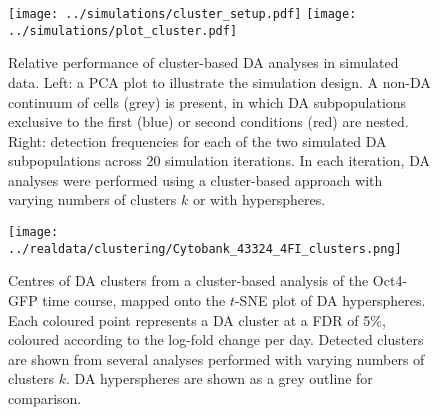 \documentclass{article}
\begin{document}
\begin{figure}[p]
\begin{center}
\texttt{[image: ../simulations/cluster\_setup.pdf]}
\texttt{[image: ../simulations/plot\_cluster.pdf]}
\end{center}
\caption{Relative performance of cluster-based DA analyses in simulated data.
    Left: a PCA plot to illustrate the simulation design.
    A non-DA continuum of cells (grey) is present, in which DA subpopulations exclusive to the first (blue) or second conditions (red) are nested.
    Right: detection frequencies for each of the two simulated DA subpopulations across 20 simulation iterations.
    In each iteration, DA analyses were performed using a cluster-based approach with varying numbers of clusters $k$ or with hyperspheres.
}
\label{fig:clustersim}
\end{figure}

\begin{figure}[p]
\begin{center}
\texttt{[image: ../realdata/clustering/Cytobank\_43324\_4FI\_clusters.png]}
\end{center}
\caption{Centres of DA clusters from a cluster-based analysis of the Oct4-GFP time course, mapped onto the $t$-SNE plot of DA hyperspheres.
Each coloured point represents a DA cluster at a FDR of 5\%, coloured according to the log-fold change per day.
Detected clusters are shown from several analyses performed with varying numbers of clusters $k$.
DA hyperspheres are shown as a grey outline for comparison.
}
\end{figure}
\end{document}
